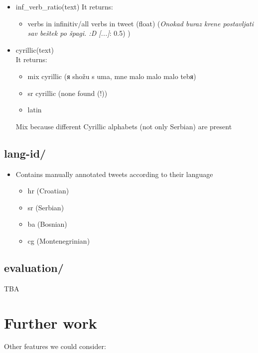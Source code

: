\documentclass[a4paper]{article}
\begin{document}
\begin{itemize}
\item inf\_verb\_ratio(text)
It returns:
\begin{itemize}
\item  verbs in infinitiv/all verbs in tweet (float) (\textit{Onokad buraz krene postavljati sav beštek po špagi. :D [...]}: 0.5)
)
\end{itemize}

\item cyrillic(text)\\
It returns:
\begin{itemize}
\item mix cyrillic (я shožu s uma, mne malo malo malo tebя)
\item sr cyrillic (none found (!)) %
\item latin
\end{itemize}
Mix because different Cyrillic alphabets (not only Serbian) are present

\end{itemize}



\subsection{lang-id/}
\begin{itemize}
\item Contains manually annotated tweets according to their language 
\begin{itemize}
\item hr (Croatian)
\item sr (Serbian)
\item ba (Bosnian)
\item cg (Montenegrinian)
\end{itemize}
\end{itemize}


\subsection{evaluation/}
TBA




\section{Further work}

Other features we could consider:
\end{document}
